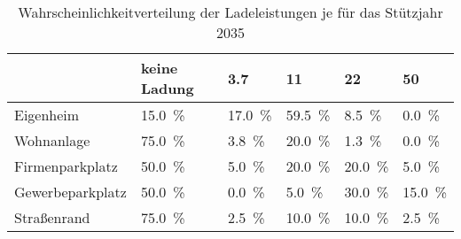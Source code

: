 {
\renewcommand{\arraystretch}{1.2}%
\begin{table}[H]
	\begin{center}
		\caption{Wahrscheinlichkeitverteilung der Ladeleistungen je \UC für das Stützjahr \num{2035}}
		\begin{tabu} to \textwidth {X[1.7] X[1.3, r] X[1, r] X[1, r] X[1, r] X[1, r]}
			\hline
			\UC  & keine Ladung        & \SI{3.7}{\kw}       & \SI{11}{\kw}        & \SI{22}{\kw}        & \SI{50}{\kw}        \\ \hline
			Eigenheim        & \SI{15.0}{\percent} & \SI{17.0}{\percent} & \SI{59.5}{\percent} & \SI{8.5}{\percent}  & \SI{0.0}{\percent}  \\
			Wohnanlage       & \SI{75.0}{\percent} & \SI{3.8}{\percent}  & \SI{20.0}{\percent} & \SI{1.3}{\percent}  & \SI{0.0}{\percent}  \\
			Firmenparkplatz  & \SI{50.0}{\percent} & \SI{5.0}{\percent}  & \SI{20.0}{\percent} & \SI{20.0}{\percent} & \SI{5.0}{\percent}  \\
			Gewerbeparkplatz & \SI{50.0}{\percent} & \SI{0.0}{\percent}  & \SI{5.0}{\percent}  & \SI{30.0}{\percent} & \SI{15.0}{\percent} \\
			Straßenrand      & \SI{75.0}{\percent} & \SI{2.5}{\percent}  & \SI{10.0}{\percent} & \SI{10.0}{\percent} & \SI{2.5}{\percent}  \\ \hline
		\end{tabu}
		\label{tab:UCProbability2035}
	\end{center}
	\vspace{-3mm}%
\end{table}
}

